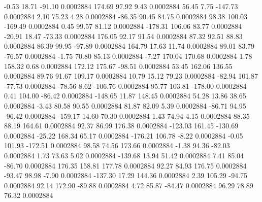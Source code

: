        -0.53       18.71      -91.10     0.0002884
      174.69       97.92        9.43     0.0002884
       56.45        7.75     -147.73     0.0002884
        2.10       75.23        4.28     0.0002884
      -86.35       90.45       84.75     0.0002884
       98.38      100.03     -169.49     0.0002884
        0.45       99.57       81.12     0.0002884
     -178.31      106.06       83.77     0.0002884
      -20.91       18.47      -73.33     0.0002884
      176.05       92.17       91.54     0.0002884
       87.32       92.51       88.83     0.0002884
       86.39       99.95      -97.89     0.0002884
      164.79       17.63       11.74     0.0002884
       89.01       83.79      -76.57     0.0002884
       -1.75       70.80       85.13     0.0002884
       -7.27      170.04      170.68     0.0002884
        1.78      158.32        0.68     0.0002884
      172.12      175.67      -98.51     0.0002884
       53.45      162.06      136.55     0.0002884
       89.76       91.67      109.17     0.0002884
       10.79       15.12       79.23     0.0002884
      -82.94      101.87      -77.73     0.0002884
      -78.56        8.62     -106.76     0.0002884
       95.77      103.81     -178.00     0.0002884
        0.41      104.00      -86.42     0.0002884
     -148.65       11.87      148.45     0.0002884
       54.28       13.86       38.65     0.0002884
       -3.43       80.58       90.55     0.0002884
       81.87       82.09        5.39     0.0002884
      -86.71       94.95      -96.42     0.0002884
     -159.17       14.60       70.30     0.0002884
        1.43       74.94        4.15     0.0002884
       88.35       88.19      164.61     0.0002884
       92.37       86.99      176.38     0.0002884
     -123.03      161.45     -130.69     0.0002884
      -25.22      168.34       65.17     0.0002884
     -176.21      106.78       -8.22     0.0002884
       -0.05      101.93     -172.51     0.0002884
       98.58       74.56      173.66     0.0002884
       -1.38       94.36      -82.03     0.0002884
        1.73       73.63        5.02     0.0002884
     -139.68       13.94       51.42     0.0002884
        7.41       85.04      -86.70     0.0002884
      176.35      158.81      177.78     0.0002884
       92.27       84.93      176.75     0.0002884
      -93.47       98.98       -7.90     0.0002884
     -137.30       17.29      144.36     0.0002884
        2.39      105.29      -94.75     0.0002884
       92.14      172.90      -89.88     0.0002884
        4.72       85.87      -84.47     0.0002884
       96.29       78.89       76.32     0.0002884
